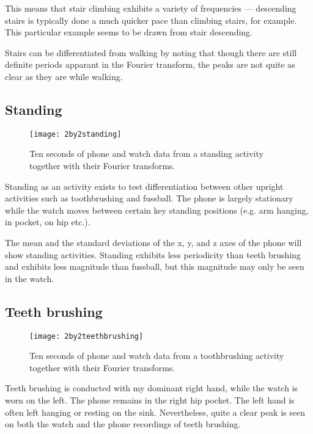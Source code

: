       This means that stair climbing exhibits a variety of frequencies --- descending stairs is typically done a much quicker pace than climbing stairs, for example. This particular example seems to be drawn from stair descending.
      
      Stairs can be differentiated from walking by noting that though there are still definite periods apparant in the Fourier transform, the peaks are not quite as clear as they are while walking.
    \pagebreak[4]
    \subsection{Standing}
      \begin{figure}[!th]
        \centering
        \texttt{[image: 2by2standing]}
        \caption[Standing sample]{Ten seconds of phone and watch data from a standing activity together with their Fourier transforms.}
        \label{fig:2by2standing}
      \end{figure}
      Standing as an activity exists to test differentiation between other upright activities such as toothbrushing and fussball. The phone is largely stationary while the watch moves between certain key standing positions (e.g. arm hanging, in pocket, on hip etc.). 
      
      The mean and the standard deviations of the x, y, and z axes of the phone will show standing activities. Standing exhibits less periodicity than teeth brushing and exhibits less magnitude than fussball, but this magnitude may only be seen in the watch.
    \pagebreak[4]
    \subsection{Teeth brushing}
      \begin{figure}[!th]
        \centering
        \texttt{[image: 2by2teethbrushing]}
        \caption[Teethbrushing sample]{Ten seconds of phone and watch data from a toothbrushing activity together with their Fourier transforms.}
        \label{fig:2by2teethbrushing}
      \end{figure}
      
      Teeth brushing is conducted with my dominant right hand, while the watch is worn on the left. The phone remains in the right hip pocket. The left hand is often left hanging or resting on the sink. Nevertheless, quite a clear peak is seen on both the watch and the phone recordings of teeth brushing.
      
